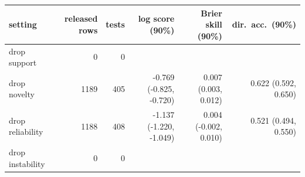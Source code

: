 \begin{tabular}{lrrrrr}
\toprule
setting & released rows & tests & log score (90\%) & Brier skill (90\%) & dir.\ acc.\ (90\%) \\
\midrule
drop support & 0 & 0 &  &  &  \\
drop novelty & 1189 & 405 & -0.769 (-0.825, -0.720) & 0.007 (0.003, 0.012) & 0.622 (0.592, 0.650) \\
drop reliability & 1188 & 408 & -1.137 (-1.220, -1.049) & 0.004 (-0.002, 0.010) & 0.521 (0.494, 0.550) \\
drop instability & 0 & 0 &  &  &  \\
\bottomrule
\end{tabular}
